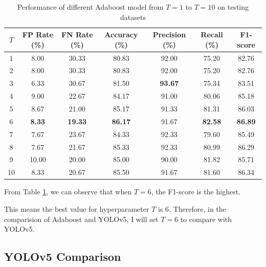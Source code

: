 \documentclass{article}[12pt, twocolumn]
\begin{document}
\begin{table}[H]
    \centering
    \caption{Performance of different Adaboost model from $T=1$ to $T=10$ on testing datasets}
    \begin{tabular}{@{}ccccccc@{}}
        \toprule
        $T$  & FP Rate (\%)  & FN Rate (\%)   & Accuracy (\%)  & Precision (\%)   & Recall (\%)      & F1-score  \\ \midrule
        1  & 8.00          & 30.33          & 80.83          & 92.00         & 75.20         & 82.76         \\
        2  & 8.00          & 30.33          & 80.83          & 92.00         & 75.20         & 82.76         \\
        3  & 6.33          & 30.67          & 81.50          & \textbf{93.67} & 75.34         & 83.51         \\
        4  & 9.00          & 22.67          & 84.17          & 91.00         & 80.06         & 85.18         \\
        5  & 8.67          & 21.00          & 85.17          & 91.33         & 81.31         & 86.03         \\
        6  & \textbf{8.33} & \textbf{19.33} & \textbf{86.17} & 91.67         & \textbf{82.58} & \textbf{86.89} \\
        7  & 7.67          & 23.67          & 84.33          & 92.33         & 79.60         & 85.49         \\
        8  & 7.67          & 21.67          & 85.33          & 92.33         & 80.99         & 86.29         \\
        9  & 10.00         & 20.00          & 85.00          & 90.00         & 81.82         & 85.71         \\
        10 & 8.33          & 20.67          & 85.50          & 91.67         & 81.60         & 86.34         \\ \bottomrule
    \end{tabular}
    \label{tab:ada_test}    
\end{table}

From Table \ref{tab:ada_test}, we can observe that when $T=6$, the F1-score is the highest.

This means the best value for hyperparameter $T$ is 6. Therefore, in the comparision of Adaboost
and YOLOv5, I will set $T=6$ to compare with YOLOv5.
\subsection{YOLOv5 Comparison} \label{subsec:yolo_comp}
\end{document}
